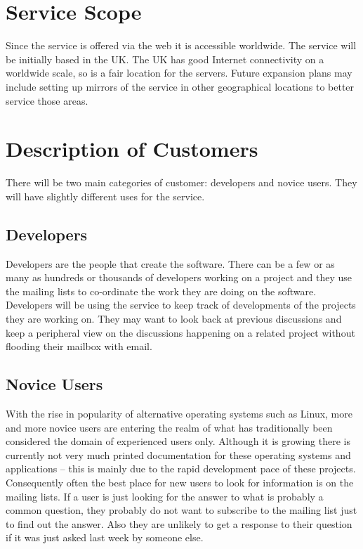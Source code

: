 

\section{Service Scope}
Since the service is offered via the web it is accessible worldwide.  The service will be initially based in the UK.  The UK has good Internet connectivity on a worldwide scale, so is a fair location for the servers.  Future expansion plans may include setting up mirrors of the service in other geographical locations to better service those areas.

\section{Description of Customers}
There will be two main categories of customer: developers and novice users.  They will have slightly different uses for the service. 

\subsection{Developers}
Developers are the people that create the software.  There can be a few or as many as hundreds or thousands of developers working on a project and they use the mailing lists to co-ordinate the work they are doing on the software.   Developers will be using the service to keep track of developments of the projects they are working on.  They may want to look back at previous discussions and keep a peripheral view on the discussions happening on a related project without flooding their mailbox with email.

\subsection{Novice Users}
With the rise in popularity of alternative operating systems such as Linux, more and more novice users are entering the realm of what has traditionally been considered the domain of experienced users only.  Although it is growing there is currently not very much printed documentation for these operating systems and applications -- this is mainly due to the rapid development pace of these projects.  Consequently often the best place for new users to look for information is on the mailing lists.  If a user is just looking for the answer to what is probably a common question, they probably do not want to subscribe to the mailing list just to find out the answer.  Also they are unlikely to get a response to their question if it was just asked last week by someone else.


